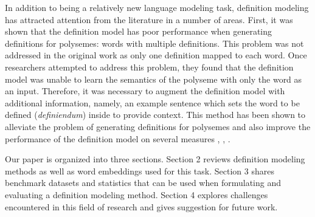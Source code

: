 In addition to being a relatively new language modeling task, definition
modeling has attracted attention from the literature in a number of areas.
First, it was shown that the definition model has poor performance when
generating definitions for polysemes: words with multiple definitions. This
problem was not addressed in the original work as only one definition mapped to
each word. Once researchers attempted to address this problem, they found that
the definition model was unable to learn the semantics of the polyseme with only
the word as an input. Therefore, it was necessary to augment the definition
model with additional information, namely, an example sentence which sets the
word to be defined (\textit{definiendum}) inside to provide context. This method
has been shown to alleviate the problem of generating definitions for polysemes
and also improve the performance of the definition model on several measures
\cite{gadetsky_conditional_2018}, \cite{mickus_mark_2019},
\cite{bevilacqua_generationary_2020}.

Our paper is organized into three sections. Section 2 reviews definition modeling
methods as well as word embeddings used for this task. Section 3 shares benchmark
datasets and statistics that can be used when formulating and evaluating a definition
modeling method. Section 4 explores challenges encountered in this field of research
and gives suggestion for future work.
